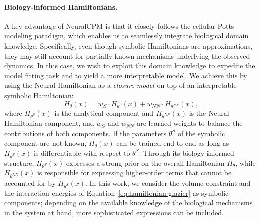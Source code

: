 \paragraph{Biology-informed Hamiltonians.} 
A key advantage of NeuralCPM is that it closely follows the cellular Potts modeling paradigm, which enables us to seamlessly integrate biological domain knowledge. Specifically, even though symbolic Hamiltonians are approximations, they may still account for partially known mechanisms underlying the observed dynamics. In this case, we wish to exploit this domain knowledge to expedite the model fitting task and to yield a more interpretable model. We achieve this by using the Neural Hamiltonian as a \emph{closure model} on top of an interpretable symbolic Hamiltonian:%
\begin{equation}\label{eq:closure-model}
    H_\theta(x) = w_S \cdot H_{\theta^S}(x) + w_{NN} \cdot H_{\theta^{NN}}(x),
\end{equation}
where $H_{\theta^S}(x)$ is the analytical component and $H_{\theta^{NN}}(x)$ is the Neural Hamiltonian component, and $w_S$ and $w_{NN}$ are learned weights to balance the contributions of both components. If the parameters $\theta^S$ of the symbolic component are not known, $H_\theta(x)$ can be trained end-to-end as long as $H_{\theta^S}(x)$ is differentiable with respect to $\theta^S$. Through its biology-informed structure, $H_{\theta^S}(x)$ expresses a strong prior on the overall Hamiltonian $H_\theta$, while $H_{\theta^{NN}}(x)$ is responsible for expressing higher-order terms that cannot be accounted for by $H_{\theta^S}(x)$. In this work, we consider the volume constraint and the interaction energies of Equation~\ref{eq:hamiltonian-glazier} as symbolic components; depending on the available knowledge of the biological mechanisms in the system at hand, more sophisticated expressions can be included.









